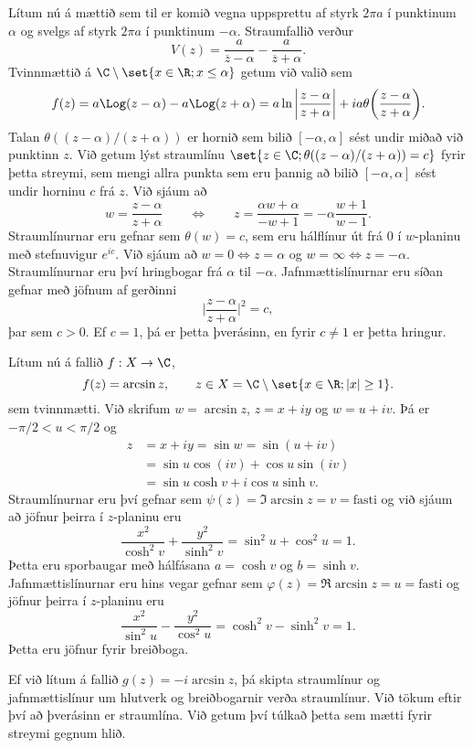 \begin{sy}  Lítum nú á mættið sem til er komið vegna uppsprettu af styrk
$2\pi a$ í punktinum $\alpha$ og svelgs af styrk $2\pi a$ í punktinum
$-\alpha$.  Straumfallið verður
 $$V(z)=\dfrac {a}{\overline z-\alpha}-\dfrac a{\overline z+\alpha}.
 $$
Tvinnmættið á $\C\setminus\set{x\in \R; x\leq \alpha}$ getum við
valið sem 
 $$f(z)=a\Log(z-\alpha)-a\Log(z+\alpha)=
a\ln\bigg|\dfrac{z-\alpha}{z+\alpha}
\bigg | +ia\theta\bigg(\dfrac{z-\alpha}{z+\alpha}\bigg).
 $$
Talan $\theta((z-\alpha)/(z+\alpha))$ er hornið sem bilið
$[-\alpha,\alpha]$ sést undir miðað við punktinn $z$.
Við getum lýst straumlínu $\set{z\in \C; 
\theta((z-\alpha)/(z+\alpha))=c}$ fyrir þetta streymi,  sem mengi allra
punkta sem eru þannig að bilið $[-\alpha,\alpha]$ sést undir 
horninu $c$ frá $z$.  
Við sjáum að  
$$w=\dfrac{z-\alpha}{z+\alpha} \qquad \Leftrightarrow \qquad 
z=\dfrac {\alpha w+\alpha}{-w+1}=-\alpha\dfrac{w+1}{w-1}.
 $$
Straumlínurnar eru gefnar sem $\theta(w)=c$, sem eru hálflínur út frá
$0$ í $w$-planinu með stefnuvigur $e^{ic}$.  
Við sjáum að $w=0 \Leftrightarrow z=\alpha$ og
$w=\infty \Leftrightarrow z=-\alpha$. Straumlínurnar eru því
hringbogar frá $\alpha$ til $-\alpha$.
Jafnmættislínurnar eru síðan gefnar með jöfnum af gerðinni
$$
\bigg| \dfrac{z-{\alpha}}{z+{\alpha}} \bigg|^2=c,
$$
þar sem $c>0$.
Ef $c=1$, þá er þetta þverásinn, en fyrir $c\neq 1$ er þetta hringur.

{}
\end{sy}



\begin{sy}  Lítum nú á fallið $f:X\to \C$, 
$$
f(z)=\arcsin z, \qquad
z\in X=\C\setminus\set{x\in \R; |x|\geq 1}.
$$
sem tvinnmætti.  Við skrifum $w=\arcsin z$, 
$z=x+iy$ og $w=u+iv$.  Þá er $-{\pi}/2<u<{\pi}/2$ og 
\begin{align*}
z&=x+iy=\sin w=\sin(u+iv)\\
&=\sin u\cos(iv)+\cos u\sin(iv)\\
&=\sin u\cosh v+i\cos u\sinh v.
\end{align*}
Straumlínurnar eru því gefnar sem 
${\psi}(z)=\Im \arcsin z=v=\text{fasti}$ 
og við sjáum að jöfnur þeirra í $z$-planinu eru
$$
\dfrac{x^2}{\cosh^2 v}+\dfrac{y^2}{\sinh^2 v}=
\sin^2u+\cos^2u=1.
$$
Þetta eru sporbaugar með hálfásana $a=\cosh v$ og $b=\sinh v$.
Jafnmættislínurnar eru hins vegar gefnar sem
${\varphi}(z)=\Re \arcsin z=u=\text{fasti}$ 
og  jöfnur þeirra í $z$-planinu eru
$$
\dfrac{x^2}{\sin^2 u}-\dfrac{y^2}{\cos^2 u}=
\cosh^2v-\sinh^2v=1.
$$
Þetta eru jöfnur fyrir breiðboga.




Ef við lítum á fallið $g(z)=-i\arcsin z$, þá skipta straumlínur og
jafnmættislínur um hlutverk og breiðbogarnir verða straumlínur.  Við
tökum eftir því að þverásinn er straumlína.  Við getum því túlkað þetta
sem mætti fyrir streymi gegnum hlið.



\end{sy}

